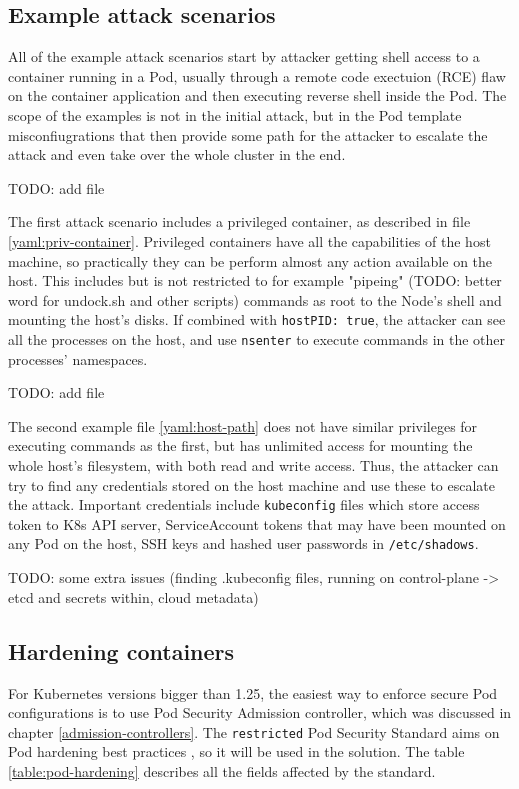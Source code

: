 \documentclass[english, 12pt, a4paper, sci, utf8, a-2b, online]{aaltothesis}
\begin{document}
\subsection{Example attack scenarios}

All of the example attack scenarios start by attacker getting shell access to a container running in a Pod, usually through a remote code exectuion (RCE) flaw on the container application and then executing reverse shell inside the Pod. The scope of the examples is not in the initial attack, but in the Pod template misconfiugrations that then provide some path for the attacker to escalate the attack and even take over the whole cluster in the end.

TODO: add file \label{yaml:priv-container}

The first attack scenario includes a privileged container, as described in file \ref{yaml:priv-container}. Privileged containers have all the capabilities of the host machine, so practically they can be perform almost any action available on the host. This includes but is not restricted to for example "pipeing" (TODO: better word for undock.sh and other scripts) commands as root to the Node's shell and mounting the host's disks. If combined with \texttt{hostPID:\ true}, the attacker can see all the processes on the host, and use \texttt{nsenter} to execute commands in the other processes' namespaces.

TODO: add file \label{yaml:host-path}

The second example file \ref{yaml:host-path} does not have similar privileges for executing commands as the first, but has unlimited access for mounting the whole host's filesystem, with both read and write access. Thus, the attacker can try to find any credentials stored on the host machine and use these to escalate the attack. Important credentials include \texttt{kubeconfig} files which store access token to K8s API server, ServiceAccount tokens that may have been mounted on any Pod on the host, SSH keys and hashed user passwords in \texttt{/etc/shadows}.

TODO: some extra issues (finding .kubeconfig files, running on control-plane -> etcd and secrets within, cloud metadata)

\subsection{Hardening containers}

For Kubernetes versions bigger than 1.25, the easiest way to enforce secure Pod configurations is to use Pod Security Admission controller, which was discussed in chapter \ref{admission-controllers}. The \texttt{restricted} Pod Security Standard aims on Pod hardening best practices \cite{k8s-docs-pss}, so it will be used in the solution. The table \ref{table:pod-hardening} describes all the fields affected by the standard.
\end{document}
